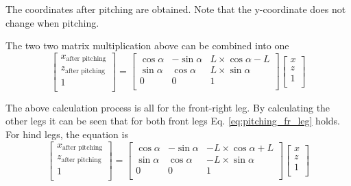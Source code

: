 The coordinates after pitching are obtained. Note that the y-coordinate does not change when pitching.

The two two matrix multiplication above can be combined into one
\begin{equation}\label{eq:pitching_fr_leg}
   \begin{bmatrix}
   x_\text{after pitching} \\
   z_\text{after pitching} \\
   1                       \\
   \end{bmatrix}
   =
   \begin{bmatrix}
   \cos\alpha & -\sin\alpha & L \times \cos\alpha - L \\
   \sin\alpha & \cos\alpha & L \times \sin\alpha \\
   0 & 0 & 1 \\
   \end{bmatrix}
   \begin{bmatrix}
   x \\
   z \\
   1 \\
   \end{bmatrix}
\end{equation}

The above calculation process is all for the front-right leg. By calculating the other legs it can be seen that for both front legs Eq. \ref{eq:pitching_fr_leg} holds. For hind legs, the equation is
\begin{equation}
   \begin{bmatrix}
   x_\text{after pitching} \\
   z_\text{after pitching} \\
   1                       \\
   \end{bmatrix}
   =
   \begin{bmatrix}
   \cos\alpha & -\sin\alpha & -L \times \cos\alpha + L \\
   \sin\alpha & \cos\alpha & -L \times \sin\alpha \\
   0 & 0 & 1 \\
   \end{bmatrix}
   \begin{bmatrix}
   x \\
   z \\
   1 \\
   \end{bmatrix}
\end{equation}

